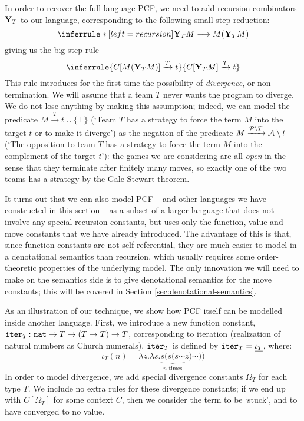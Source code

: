 \documentclass{article}
\begin{document}
In order to recover the full language PCF, we need to add recursion combinators $\mathbf{Y}_T$ to our language, corresponding to the following small-step reduction:
\[
  \inferrule*[left=recursion]{ }{\Y_T M \opto M ( \Y_T M )}
  \]
giving us the big-step rule
\[
  \inferrule{C[M (\Y_T M)] \Tct}{C[\Y_T M] \Tct}
  \]
This rule introduces for the first time the possibility of \emph{divergence}, or non-termination.  
We will assume that a team $T$ never wants the program to diverge.  
We do not lose anything by making this assumption; indeed, we can model the predicate $M \xrightarrow{T} t \cup \{\bot\}$ (`Team $T$ has a strategy to force the term $M$ into the target $t$ or to make it diverge') as the negation of the predicate $M \xrightarrow{\mathcal P\setminus T}{\mathcal{A}} \setminus t$ (`The opposition to team $T$ has a strategy to force the term $M$ into the complement of the target $t$'): the games we are considering are all \emph{open} in the sense that they terminate after finitely many moves, so exactly one of the two teams has a strategy by the Gale-Stewart theorem.

It turns out that we can also model PCF -- and other languages we have constructed in this section -- as a subset of a larger language that does not involve any special recursion constants, but uses only the function, value and move constants that we have already introduced.  
The advantage of this is that, since function constants are not self-referential, they are much easier to model in a denotational semantics than recursion, which usually requires some order-theoretic properties of the underlying model.  
The only innovation we will need to make on the semantics side is to give denotational semantics for the move constants; this will be covered in Section \ref{sec:denotational-semantics}.

As an illustration of our technique, we show how PCF itself can be modelled inside another language.
First, we introduce a new function constant, ${\mathtt{iter}}_T\colon {\mathtt{nat}} \to T \to (T \to T) \to T$, corresponding to iteration (realization of natural numbers as Church numerals).  
${\mathtt{iter}}_T$ is defined by ${\mathtt{iter}}_T={\underline{\iota_T}}$, where:
\[
  \iota_T(n) = \lambda z.\lambda s.\underbrace{s (s (s \cdots}_{n\text{ times}}z)\cdots))
    \]
In order to model divergence, we add special divergence constants $\Omega_T$ for each type $T$.  
We include no extra rules for these divergence constants; if we end up with $C[\Omega_T]$ for some context $C$, then we consider the term to be `stuck', and to have converged to no value.
\end{document}
